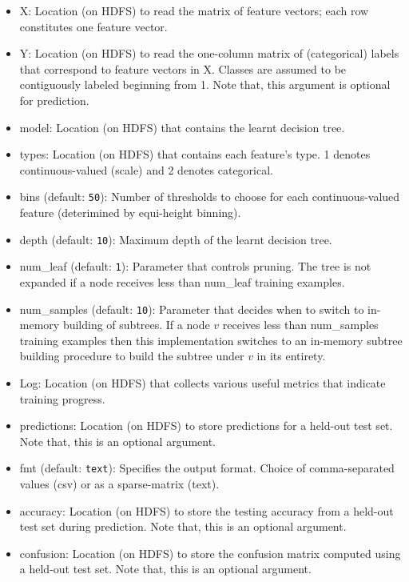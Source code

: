 \begin{itemize}
\item X: Location (on HDFS) to read the matrix of feature vectors; 
each row constitutes one feature vector.
\item Y: Location (on HDFS) to read the one-column matrix of (categorical) 
labels that correspond to feature vectors in X. Classes are assumed to be
contiguously labeled beginning from 1. Note that, this argument is optional
for prediction.
\item model: Location (on HDFS) that contains the learnt decision tree.
\item types: Location (on HDFS) that contains each feature's type. 1 denotes
continuous-valued (scale) and 2 denotes categorical.
\item bins (default: {\tt 50}): Number of thresholds to choose for each 
continuous-valued feature (deterimined by equi-height binning). 
\item depth (default: {\tt 10}): Maximum depth of the learnt decision tree.
\item num\_leaf (default: {\tt 1}): Parameter that controls pruning. The tree
is not expanded if a node receives less than num\_leaf training examples.
\item num\_samples (default: {\tt 10}): Parameter that decides when to switch
to in-memory building of subtrees. If a node $v$ receives less than num\_samples
training examples then this implementation switches to an in-memory subtree
building procedure to build the subtree under $v$ in its entirety.
\item Log: Location (on HDFS) that collects various useful metrics that indicate
training progress.
\item predictions: Location (on HDFS) to store predictions for a held-out test set.
Note that, this is an optional argument.
\item fmt (default: {\tt text}): Specifies the output format. Choice of 
comma-separated values (csv) or as a sparse-matrix (text).
\item accuracy: Location (on HDFS) to store the testing accuracy from a 
held-out test set during prediction. Note that, this is an optional argument.
\item confusion: Location (on HDFS) to store the confusion matrix
computed using a held-out test set. Note that, this is an optional 
argument.
\end{itemize}

 
